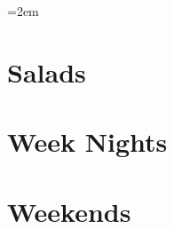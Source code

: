 \documentclass[landscape,12pt,openany]{book}
\begin{document}
\rmfamily

\setlength{\columnseprule}{0pt}
\columnsep=2em

\setcounter{tocdepth}{1}
\small
\tableofcontents

\newpage
\thispagestyle{empty}
\mbox{}

\normalsize

\setlength{\parskip}{.5em}

\chapter{Salads}








\chapter{Week Nights}











\chapter{Weekends}










\setlength{\parskip}{0pt}
\listoffigures
\end{document}
